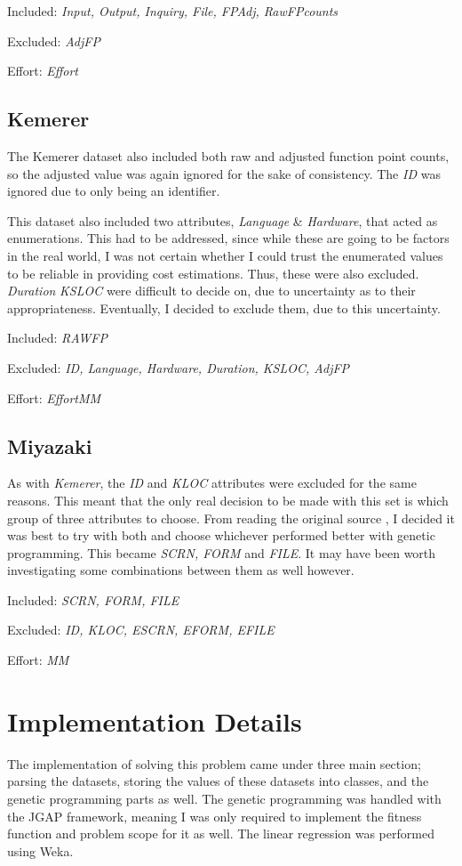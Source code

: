 \documentclass[11pt, a4paper]{article}
\begin{document}
Included: \emph{Input, Output, Inquiry, File, FPAdj, RawFPcounts}

Excluded: \emph{AdjFP}

Effort: \emph{Effort}

\subsection{Kemerer} %
\label{sub:kemerer}
The Kemerer dataset also included both raw and adjusted function point counts,
so the adjusted value was again ignored for the sake of consistency. The
\emph{ID} was ignored due to only being an identifier.

This dataset also included two attributes, \emph{Language} \& \emph{Hardware},
that acted as enumerations. This had to be addressed, since while these are going
to be factors in the real world, I was not certain whether I could trust the
enumerated values to be reliable in providing cost estimations. Thus, these were
also excluded. \emph{Duration} \emph{KSLOC} were difficult to decide on, due to
uncertainty as to their appropriateness. Eventually, I decided to exclude them,
due to this uncertainty.

Included: \emph{RAWFP}

Excluded: \emph{ID, Language, Hardware, Duration, KSLOC, AdjFP}

Effort: \emph{EffortMM}

\subsection{Miyazaki} %
\label{sub:miyazaki}
As with \emph{Kemerer}, the \emph{ID} and \emph{KLOC} attributes were excluded
for the same reasons. This meant that the only real decision to be made with
this set is which group of three attributes to choose. From reading the original
source \cite[Section~4.2]{MIYAZAKI19943}, I decided it was best to try with both
and choose whichever performed better with genetic programming. This became
\emph{SCRN, FORM} and \emph{FILE}. It may have been worth investigating some
combinations between them as well however.

Included: \emph{SCRN, FORM, FILE}

Excluded: \emph{ID, KLOC, ESCRN, EFORM, EFILE}

Effort: \emph{MM}

\section{Implementation Details} %
\label{sec:implementation_details}
The implementation of solving this problem came under three main section;
parsing the datasets, storing the values of these datasets into classes, and the
genetic programming parts as well. The genetic programming was handled with the
JGAP framework, meaning I was only required to implement the fitness function
and problem scope for it as well. The linear regression was performed using
Weka.
\end{document}
